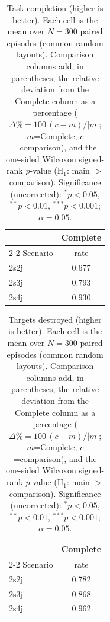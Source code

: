 
\begin{table}[ht]
  \centering
  \caption{Task completion (higher is better). Each cell is the mean over $N=300$ paired episodes (common random layouts). Comparison columns add, in parentheses, the relative deviation from the Complete column as a percentage ($\Delta\%=100\,(c-m)/|m|$; $m$=Complete, $c$=comparison), and the one-sided Wilcoxon signed-rank $p$-value (H$_1$: main $>$ comparison). Significance (uncorrected): $^{*}p<0.05$, $^{**}p<0.01$, $^{***}p<0.001$; $\alpha=0.05$.}
  \label{tab:wilcoxon-completion}
  \small
  \begin{tabular}{l c}
    \toprule
     & Complete \\
    \cmidrule(lr){2-2}
    Scenario & {rate} \\
    \midrule
    2s2j & 0.677 \\
    2s3j & 0.793 \\
    2s4j & 0.930 \\
    \bottomrule
  \end{tabular}
\end{table}

\begin{table}[ht]
  \centering
  \caption{Targets destroyed (higher is better). Each cell is the mean over $N=300$ paired episodes (common random layouts). Comparison columns add, in parentheses, the relative deviation from the Complete column as a percentage ($\Delta\%=100\,(c-m)/|m|$; $m$=Complete, $c$=comparison), and the one-sided Wilcoxon signed-rank $p$-value (H$_1$: main $>$ comparison). Significance (uncorrected): $^{*}p<0.05$, $^{**}p<0.01$, $^{***}p<0.001$; $\alpha=0.05$.}
  \label{tab:wilcoxon-targets}
  \small
  \begin{tabular}{l c}
    \toprule
     & Complete \\
    \cmidrule(lr){2-2}
    Scenario & {rate} \\
    \midrule
    2s2j & 0.782 \\
    2s3j & 0.868 \\
    2s4j & 0.962 \\
    \bottomrule
  \end{tabular}
\end{table}

